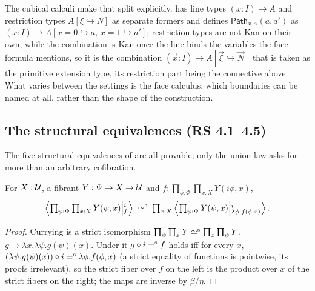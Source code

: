 \begin{remark}
	The cubical calculi make that split explicitly.
	\citet[\S3.5]{angiuli2019computational} has line types $(x{:}I)\to A$ and
	restriction types $A[\xi\hookrightarrow N]$ as separate formers and defines
	$\mathsf{Path}_{x.A}(a,a')$ as
	$(x{:}I)\to A[x=0\hookrightarrow a,\,x=1\hookrightarrow a']$; restriction
	types are not Kan on their own, while the combination is Kan once the line
	binds the variables the face formula mentions, so it is the combination
	$(\vec{x}{:}I)\to A[\vec{\xi}\hookrightarrow\vec{N}]$ that is taken as the
	primitive extension type, its restriction part being the connective above.
	What varies between the settings is the face calculus, which boundaries can
	be named at all, rather than the shape of the construction.
\end{remark}

\subsection{The structural equivalences (RS 4.1--4.5)}

The five structural equivalences of \citet[\S4, Thms~4.1--4.5]{RS2017} are all provable;
only the union law asks for more than an arbitrary cofibration.

\begin{lemma}\label{lem:rs41}
	For $X:\UU$, a fibrant $Y:\Psi\to X\to\UU$ and
	$f:\prod_{\phi:\Phi}\prod_{x:X}Y(i\phi,x)$,
	\[
		\Ext{i}{\textstyle\prod_{\psi:\Psi}\prod_{x:X}Y(\psi,x)}{f}\;\siso\;\textstyle\prod_{x:X}\Ext{i}{\textstyle\prod_{\psi:\Psi}Y(\psi,x)}{\lambda\phi.f(\phi,x)}.
	\]
\end{lemma}
\begin{proof}
	Currying is a strict isomorphism $\prod_\psi\prod_x Y\siso\prod_x\prod_\psi Y$,
	$g\mapsto\lambda x.\lambda\psi.g(\psi)(x)$. Under it $g\circ i\seq f$ holds iff
	for every $x$, $(\lambda\psi.g(\psi)(x))\circ i\seq\lambda\phi.f(\phi,x)$ (a
	strict equality of functions is pointwise, its proofs irrelevant), so the
	strict fiber over $f$ on the left is the product over $x$ of the strict fibers
	on the right; the maps are inverse by $\beta/\eta$.
\end{proof}

